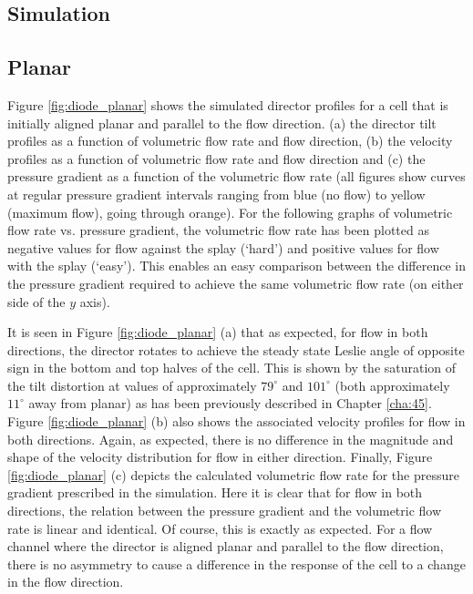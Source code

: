 \subsection{Simulation}
\subsection{Planar}
Figure \ref{fig:diode_planar} shows the simulated director profiles for a cell that is initially aligned planar and parallel to the flow direction. (a) the director tilt profiles as a function of volumetric flow rate and flow direction, (b) the velocity profiles as a function of volumetric flow rate and flow direction and (c) the pressure gradient as a function of the volumetric flow rate (all figures show curves at regular pressure gradient intervals ranging from blue (no flow) to yellow (maximum flow), going through orange). For the following graphs of volumetric flow rate vs. pressure gradient, the volumetric flow rate has been plotted as negative values for flow against the splay (`hard') and positive values for flow with the splay (`easy'). This enables an easy comparison between the difference in the pressure gradient required to achieve the same volumetric flow rate (on either side of the $y$ axis).

It is seen in Figure \ref{fig:diode_planar} (a) that as expected, for flow in both directions, the director rotates to achieve the steady state Leslie angle of opposite sign in the bottom and top halves of the cell. This is shown by the saturation of the tilt distortion at values of approximately $79^{\circ}$ and $101^{\circ}$ (both approximately $11^{\circ}$ away from planar) as has been previously described in Chapter \ref{cha:45}. Figure \ref{fig:diode_planar} (b) also shows the associated velocity profiles for flow in both directions. Again, as expected, there is no difference in the magnitude and shape of the velocity distribution for flow in either direction. Finally, Figure \ref{fig:diode_planar} (c) depicts the calculated volumetric flow rate for the pressure gradient prescribed in the simulation. Here it is clear that for flow in both directions, the relation between the pressure gradient and the volumetric flow rate is linear and identical. Of course, this is exactly as expected. For a flow channel where the director is aligned planar and parallel to the flow direction, there is no asymmetry to cause a difference in the response of the cell to a change in the flow direction.

